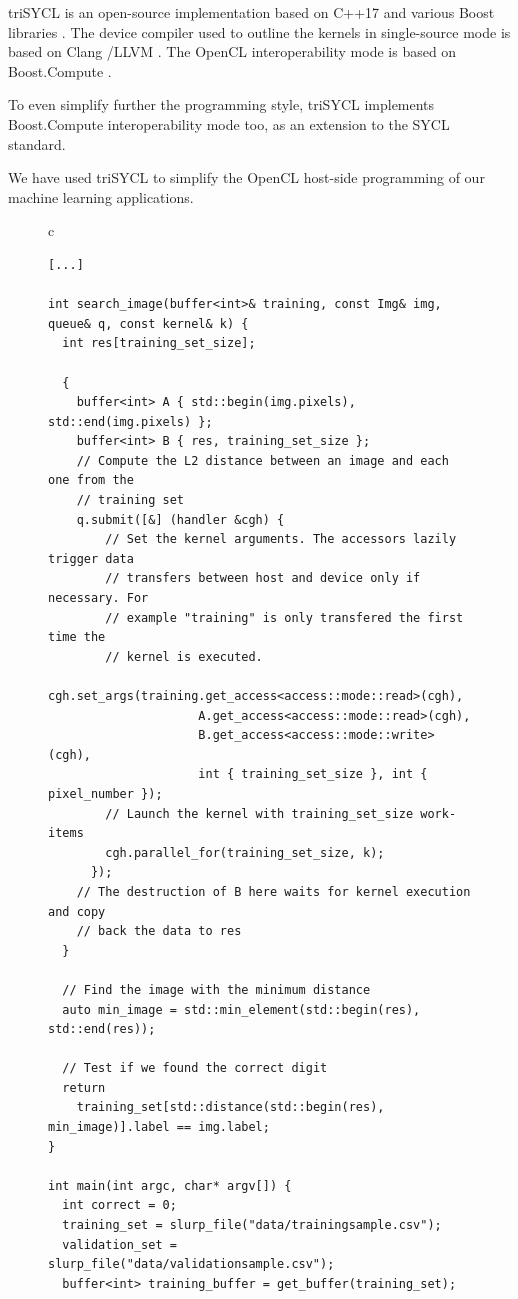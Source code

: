 \documentclass[sigplan]{acmart}
\begin{document}
triSYCL \cite{triSYCL} is an open-source implementation based on C++17
and various Boost libraries \cite{Boost-1.63}. The device compiler used to
outline the kernels in single-source mode is based on Clang
\cite{Clang-4.0}/LLVM \cite{LLVM-4.0}. The OpenCL interoperability mode is
based on Boost.Compute \cite{Boost.Compute}.

To even simplify further the programming style, triSYCL
implements Boost.Compute interoperability mode too, as an extension to
the SYCL standard.

We have used triSYCL to simplify the OpenCL host-side programming of
our machine learning applications.


\begin{figure}
  \begin{tabular}{c}
    \begin{lstlisting}[basicstyle=\scriptsize]
  [...]

int search_image(buffer<int>& training, const Img& img, queue& q, const kernel& k) {
  int res[training_set_size];

  {
    buffer<int> A { std::begin(img.pixels), std::end(img.pixels) };
    buffer<int> B { res, training_set_size };
    // Compute the L2 distance between an image and each one from the
    // training set
    q.submit([&] (handler &cgh) {
        // Set the kernel arguments. The accessors lazily trigger data
        // transfers between host and device only if necessary. For
        // example "training" is only transfered the first time the
        // kernel is executed.
        cgh.set_args(training.get_access<access::mode::read>(cgh),
                     A.get_access<access::mode::read>(cgh),
                     B.get_access<access::mode::write>(cgh),
                     int { training_set_size }, int { pixel_number });
        // Launch the kernel with training_set_size work-items
        cgh.parallel_for(training_set_size, k);
      });
    // The destruction of B here waits for kernel execution and copy
    // back the data to res
  }

  // Find the image with the minimum distance
  auto min_image = std::min_element(std::begin(res), std::end(res));

  // Test if we found the correct digit
  return
    training_set[std::distance(std::begin(res), min_image)].label == img.label;
}

int main(int argc, char* argv[]) {
  int correct = 0;
  training_set = slurp_file("data/trainingsample.csv");
  validation_set =  slurp_file("data/validationsample.csv");
  buffer<int> training_buffer = get_buffer(training_set);


\end{lstlisting}
\end{tabular}
\end{figure}
\end{document}
